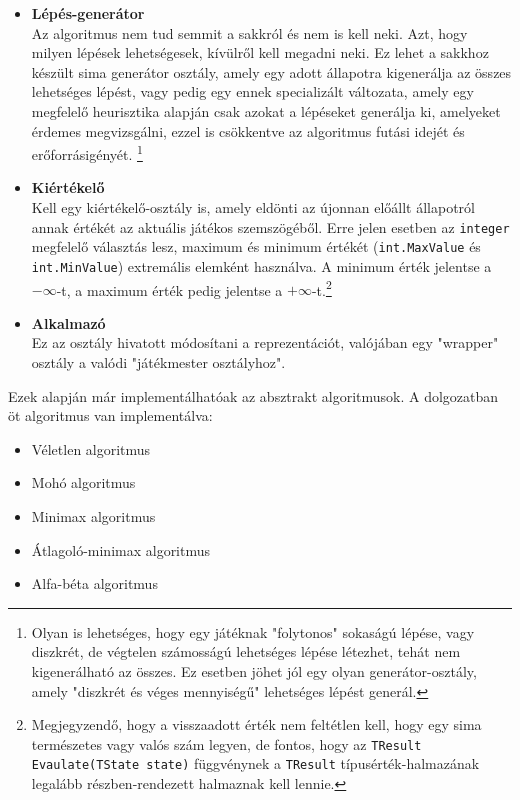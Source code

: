 \documentclass[twoside, a4paper, 12pt]{book}
\begin{document}
\begin{itemize}
	\item \textbf{Lépés-generátor} \\
	Az algoritmus nem tud semmit a sakkról és nem is kell neki. Azt, hogy milyen lépések lehetségesek, kívülről kell megadni neki. Ez lehet a sakkhoz készült sima generátor osztály, amely egy adott állapotra kigenerálja az összes lehetséges lépést, vagy pedig egy ennek specializált változata, amely egy megfelelő heurisztika alapján csak azokat a lépéseket generálja ki, amelyeket érdemes megvizsgálni, ezzel is csökkentve az algoritmus futási idejét és erőforrásigényét. \footnote{Olyan is lehetséges, hogy egy játéknak "folytonos" sokaságú lépése, vagy diszkrét, de végtelen számosságú lehetséges lépése létezhet, tehát nem kigenerálható az összes. Ez esetben jöhet jól egy olyan generátor-osztály, amely "diszkrét és véges mennyiségű" lehetséges lépést generál.}
	
	\item \textbf{Kiértékelő} \\
	Kell egy kiértékelő-osztály is, amely eldönti az újonnan előállt állapotról annak értékét az aktuális játékos szemszögéből. Erre jelen esetben az \texttt{integer} megfelelő választás lesz, maximum és minimum értékét (\texttt{int.MaxValue} és \texttt{int.MinValue}) extremális elemként használva. A minimum érték jelentse a $-\infty$-t, a maximum érték pedig jelentse a $+\infty$-t.\footnote{Megjegyzendő, hogy a visszaadott érték nem feltétlen kell, hogy egy sima természetes vagy valós szám legyen, de fontos, hogy az \texttt{TResult Evaulate(TState state)} függvénynek a \texttt{TResult} típusérték-halmazának legalább részben-rendezett halmaznak kell lennie.}
	
	
	\item \textbf{Alkalmazó} \\
	Ez az osztály hivatott módosítani a reprezentációt, valójában egy "wrapper" osztály a valódi "játékmester osztályhoz".
\end{itemize}

Ezek alapján már implementálhatóak az absztrakt algoritmusok. A dolgozatban öt algoritmus van implementálva:
\begin{itemize}
	\item Véletlen algoritmus
	\item Mohó algoritmus
	\item Minimax algoritmus
	\item Átlagoló-minimax algoritmus
	\item Alfa-béta algoritmus
\end{itemize}
\end{document}
